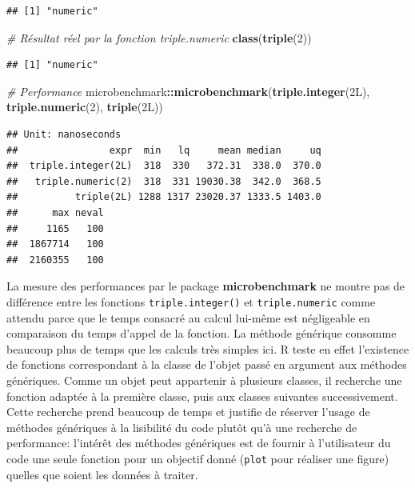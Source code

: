 \documentclass[
  12pt,
  french,
  a4paper,
  extrafontsizes,onecolumn,openright
  ]{memoir}
\newenvironment{Shaded}{\begin{snugshade}}{\end{snugshade}}
\newcommand{\CommentTok}[1]{\textcolor[rgb]{0.56,0.35,0.01}{\textit{#1}}}
\newcommand{\DecValTok}[1]{\textcolor[rgb]{0.00,0.00,0.81}{#1}}
\newcommand{\KeywordTok}[1]{\textcolor[rgb]{0.13,0.29,0.53}{\textbf{#1}}}
\newcommand{\NormalTok}[1]{#1}
\newcommand{\OperatorTok}[1]{\textcolor[rgb]{0.81,0.36,0.00}{\textbf{#1}}}
\newlength{\rf}
\begin{document}
\begin{verbatim}
## [1] "numeric"
\end{verbatim}

\begin{Shaded}
\begin{Highlighting}[]
\CommentTok{# Résultat réel par la fonction triple.numeric}
\KeywordTok{class}\NormalTok{(}\KeywordTok{triple}\NormalTok{(}\DecValTok{2}\NormalTok{))}
\end{Highlighting}
\end{Shaded}

\begin{verbatim}
## [1] "numeric"
\end{verbatim}

\begin{Shaded}
\begin{Highlighting}[]
\CommentTok{# Performance}
\NormalTok{microbenchmark}\OperatorTok{::}\KeywordTok{microbenchmark}\NormalTok{(}\KeywordTok{triple.integer}\NormalTok{(2L), }\KeywordTok{triple.numeric}\NormalTok{(}\DecValTok{2}\NormalTok{), }
    \KeywordTok{triple}\NormalTok{(2L))}
\end{Highlighting}
\end{Shaded}

\begin{verbatim}
## Unit: nanoseconds
##                expr  min   lq     mean median     uq
##  triple.integer(2L)  318  330   372.31  338.0  370.0
##   triple.numeric(2)  318  331 19030.38  342.0  368.5
##          triple(2L) 1288 1317 23020.37 1333.5 1403.0
##      max neval
##     1165   100
##  1867714   100
##  2160355   100
\end{verbatim}

\normalsize

La mesure des performances par le package \textbf{microbenchmark} ne montre pas de différence entre les fonctions \texttt{triple.integer()} et \texttt{triple.numeric} comme attendu parce que le temps consacré au calcul lui-même est négligeable en comparaison du temps d'appel de la fonction.
La méthode générique consomme beaucoup plus de temps que les calculs très simples ici.
R teste en effet l'existence de fonctions correspondant à la classe de l'objet passé en argument aux méthodes génériques.
Comme un objet peut appartenir à plusieurs classes, il recherche une fonction adaptée à la première classe, puis aux classes suivantes successivement.
Cette recherche prend beaucoup de temps et justifie de réserver l'usage de méthodes génériques à la lisibilité du code plutôt qu'à une recherche de performance: l'intérêt des méthodes génériques est de fournir à l'utilisateur du code une seule fonction pour un objectif donné (\texttt{plot} pour réaliser une figure) quelles que soient les données à traiter.
\end{document}

